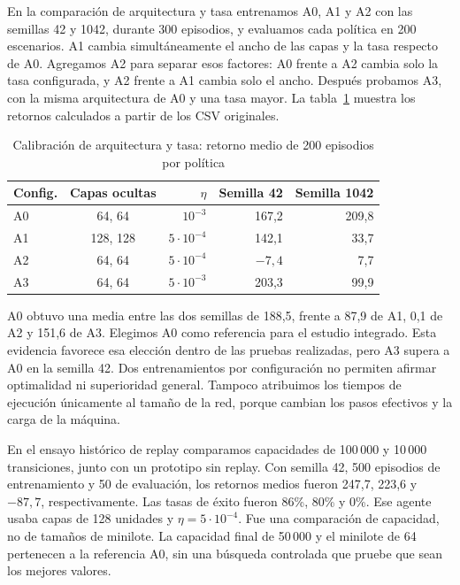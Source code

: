 \documentclass[conference]{IEEEtran}
\begin{document}
En la comparación de arquitectura y tasa entrenamos A0, A1 y A2 con las semillas 42 y 1042, durante 300 episodios, y evaluamos cada política en 200 escenarios. A1 cambia simultáneamente el ancho de las capas y la tasa respecto de A0. Agregamos A2 para separar esos factores: A0 frente a A2 cambia solo la tasa configurada, y A2 frente a A1 cambia solo el ancho. Después probamos A3, con la misma arquitectura de A0 y una tasa mayor. La tabla~\ref{tab:calibracion} muestra los retornos calculados a partir de los CSV originales.

\begin{table}[t]
\caption{Calibración de arquitectura y tasa: retorno medio de 200 episodios por política}
\label{tab:calibracion}
\centering
\begin{tabular}{@{}lcrrr@{}}
\toprule
Config. & Capas ocultas & $\eta$ & Semilla 42 & Semilla 1042 \\
\midrule
A0 & 64, 64 & $10^{-3}$ & 167,2 & 209,8 \\
A1 & 128, 128 & $5\cdot10^{-4}$ & 142,1 & 33,7 \\
A2 & 64, 64 & $5\cdot10^{-4}$ & $-7{,}4$ & 7,7 \\
A3 & 64, 64 & $5\cdot10^{-3}$ & 203,3 & 99,9 \\
\bottomrule
\end{tabular}
\end{table}

A0 obtuvo una media entre las dos semillas de 188,5, frente a 87,9 de A1, 0,1 de A2 y 151,6 de A3. Elegimos A0 como referencia para el estudio integrado. Esta evidencia favorece esa elección dentro de las pruebas realizadas, pero A3 supera a A0 en la semilla 42. Dos entrenamientos por configuración no permiten afirmar optimalidad ni superioridad general. Tampoco atribuimos los tiempos de ejecución únicamente al tamaño de la red, porque cambian los pasos efectivos y la carga de la máquina.

En el ensayo histórico de replay comparamos capacidades de 100\,000 y 10\,000 transiciones, junto con un prototipo sin replay. Con semilla 42, 500 episodios de entrenamiento y 50 de evaluación, los retornos medios fueron 247,7, 223,6 y $-87{,}7$, respectivamente. Las tasas de éxito fueron 86\%, 80\% y 0\%. Ese agente usaba capas de 128 unidades y $\eta=5\cdot10^{-4}$. Fue una comparación de capacidad, no de tamaños de minilote. La capacidad final de 50\,000 y el minilote de 64 pertenecen a la referencia A0, sin una búsqueda controlada que pruebe que sean los mejores valores.
\end{document}
